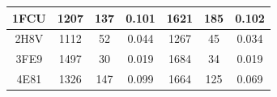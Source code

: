 \begin{table}[H]
{\begin{tabular}{|c|ccc|ccc|}
1FCU                                                              & \multicolumn{1}{c|}{1207}                                                                                              & \multicolumn{1}{c|}{137}                                                                                                & 0.101                                                                             & \multicolumn{1}{c|}{1621}                                                                                              & \multicolumn{1}{c|}{185}                                                                                                & 0.102                                                                             \\ \hline
2H8V                                                              & \multicolumn{1}{c|}{1112}                                                                                              & \multicolumn{1}{c|}{52}                                                                                                 & 0.044                                                                             & \multicolumn{1}{c|}{1267}                                                                                              & \multicolumn{1}{c|}{45}                                                                                                 & 0.034                                                                             \\ \hline
3FE9                                                              & \multicolumn{1}{c|}{1497}                                                                                              & \multicolumn{1}{c|}{30}                                                                                                 & 0.019                                                                             & \multicolumn{1}{c|}{1684}                                                                                              & \multicolumn{1}{c|}{34}                                                                                                 & 0.019                                                                             \\ \hline
4E81                                                              & \multicolumn{1}{c|}{1326}                                                                                              & \multicolumn{1}{c|}{147}                                                                                                & 0.099                                                                             & \multicolumn{1}{c|}{1664}                                                                                              & \multicolumn{1}{c|}{125}                                                                                                & 0.069                                                                             \\ \hline

\end{tabular}}
\end{table}
